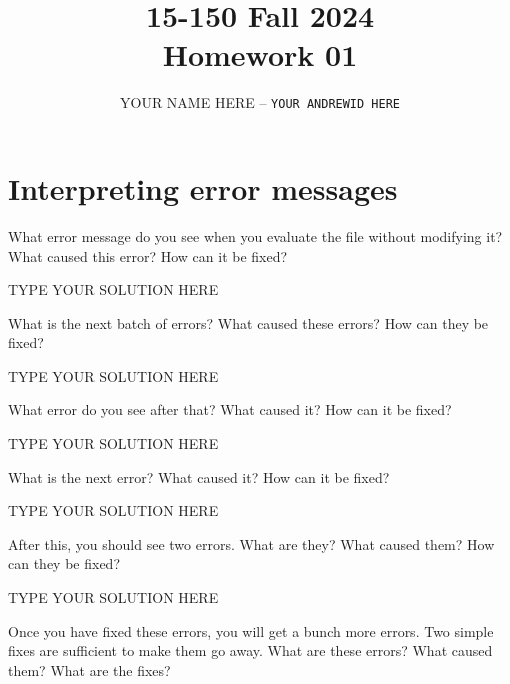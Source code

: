 \documentclass[11pt]{article}
\title{\textbf{15-150 Fall 2024\\Homework 01}}
\author{YOUR NAME HERE -- \texttt{YOUR ANDREWID HERE}}
\begin{document}
\maketitle

\section{Interpreting error messages}

\begin{task}{2} %
What error message do you see when you evaluate the  file
without modifying it?  What caused this error? How can it be
fixed?
\end{task}

\begin{solution}
TYPE YOUR SOLUTION HERE
\end{solution}


\begin{task}{2} %
What is the next batch of errors?  What caused these errors? How can they be
fixed?
\end{task}

\begin{solution}
TYPE YOUR SOLUTION HERE
\end{solution}


\begin{task}{2} %
What error do you see after that?  What caused it? How can it be fixed?
\end{task}

\begin{solution}
TYPE YOUR SOLUTION HERE
\end{solution}


\begin{task}{2} %
What is the next error?  What caused it?  How can it be fixed?
\end{task}

\begin{solution}
TYPE YOUR SOLUTION HERE
\end{solution}


\begin{task}{2} %
After this, you should see two errors.  What are they?  What caused them?  How
can they be fixed?
\end{task}

\begin{solution}
TYPE YOUR SOLUTION HERE
\end{solution}


\begin{task}{4} %
Once you have fixed these errors, you will get a bunch more errors.  Two
simple fixes are sufficient to make them go away.  What are these errors? What
caused them? What are the fixes?
\end{task}
\end{document}

